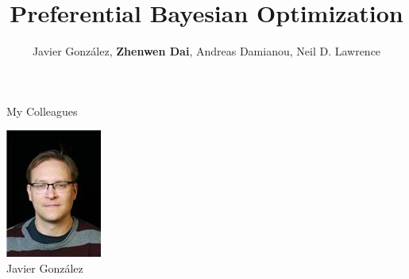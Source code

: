 \documentclass[13pt,aspectratio=1610]{beamer}
\begin{document}
\title{Preferential Bayesian Optimization}
\author{Javier Gonz\'alez, \textbf{Zhenwen Dai}, Andreas Damianou, Neil D. Lawrence}
\frame{\maketitle}


\begin{frame}{My Colleagues}
\begin{minipage}{0.3\textwidth}
\centering 
\includegraphics[width=.8\textwidth]{javier.jpeg} \\
Javier Gonz\'alez 
\end{minipage} ~
\begin{minipage}{0.3\textwidth}
\centering 

\end{minipage}
\end{frame}
\end{document}
